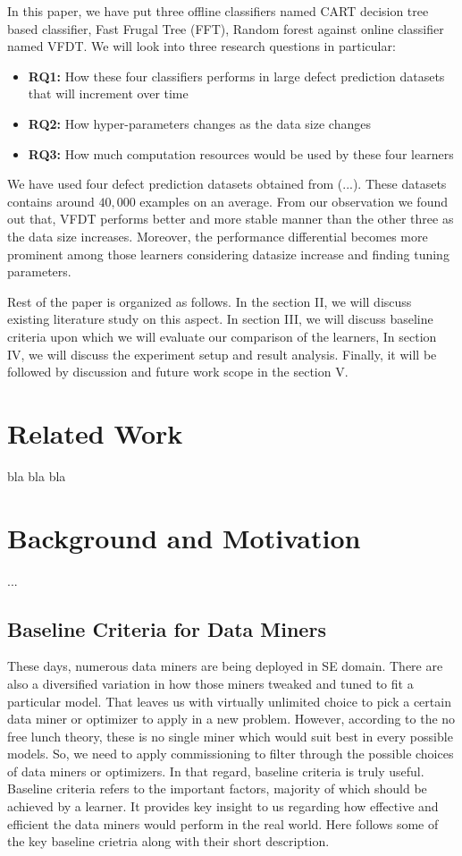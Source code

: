 \documentclass[sigplan]{acmart}\settopmatter{printfolios=true,printccs=false,printacmref=false}
\begin{document}
In this paper, we have put three offline classifiers named CART decision tree based classifier, Fast Frugal Tree (FFT), Random forest against online classifier named VFDT. We will look into three research questions in particular:
\begin{itemize}
	\item \textbf{RQ1: } How these four classifiers performs in large defect prediction datasets that will increment over time
	\item \textbf{RQ2: } How hyper-parameters changes as the data size changes
	\item \textbf{RQ3: } How much computation resources would be used by these four learners 
\end{itemize}

We have used four defect prediction datasets obtained from (...). These datasets contains around $40,000$ examples on an average. From our observation we found out that, VFDT performs better and more stable manner than the other three as the data size increases. Moreover, the performance differential becomes more prominent among those learners considering datasize increase and finding tuning parameters.  

Rest of the paper is organized as follows. In the section II, we will discuss existing literature study on this aspect. In section III, we will discuss baseline criteria upon which we will evaluate our comparison of the learners, In section IV, we will discuss the experiment setup and result analysis. Finally, it will be followed by discussion and future work scope in the section V. 

\section{Related Work}
bla bla bla

\section{Background and Motivation}
...
\subsection{Baseline Criteria for Data Miners} These days, numerous data miners are being deployed in SE domain. There are also a diversified variation in how those miners tweaked and tuned to fit a particular model. That leaves us with virtually unlimited choice to pick a certain data miner or optimizer to apply in a new problem. However, according to the no free lunch theory, these is no single miner which would suit best in every possible models. So, we need to apply commissioning to filter through the possible choices of data miners or optimizers. In that regard, baseline criteria is truly useful. Baseline criteria refers to the important factors, majority of which should be achieved by a learner. It provides key insight to us regarding how effective and efficient the data miners would perform in the real world. Here follows some of the key baseline crietria along with their short description. 
\end{document}
